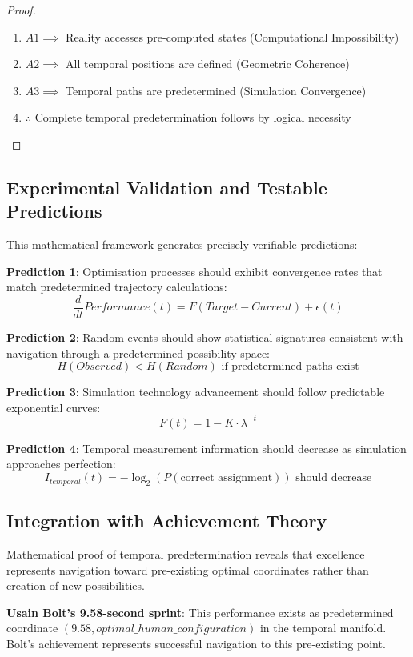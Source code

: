 \documentclass[11pt]{article}
\theoremstyle{remark}
\begin{document}
\begin{proof}
\begin{enumerate}
\item $A1 \implies$ Reality accesses pre-computed states (Computational Impossibility)
\item $A2 \implies$ All temporal positions are defined (Geometric Coherence)
\item $A3 \implies$ Temporal paths are predetermined (Simulation Convergence)
\item $\therefore$ Complete temporal predetermination follows by logical necessity
\end{enumerate}
\end{proof}

\subsection{Experimental Validation and Testable Predictions}

This mathematical framework generates precisely verifiable predictions:

\textbf{Prediction 1}: Optimisation processes should exhibit convergence rates that match predetermined trajectory calculations:
$$\frac{d}{dt}Performance(t) = F(Target - Current) + \epsilon(t)$$

\textbf{Prediction 2}: Random events should show statistical signatures consistent with navigation through a predetermined possibility space:
$$H(Observed) < H(Random) \text{ if predetermined paths exist}$$

\textbf{Prediction 3}: Simulation technology advancement should follow predictable exponential curves:
$$F(t) = 1 - K \cdot \lambda^{-t}$$

\textbf{Prediction 4}: Temporal measurement information should decrease as simulation approaches perfection:
$$I_{temporal}(t) = -\log_2(P(\text{correct assignment})) \text{ should decrease}$$

\subsection{Integration with Achievement Theory}

Mathematical proof of temporal predetermination reveals that excellence represents navigation toward pre-existing optimal coordinates rather than creation of new possibilities.

\textbf{Usain Bolt's 9.58-second sprint}: This performance exists as predetermined coordinate $(9.58, optimal\_human\_configuration)$ in the temporal manifold. Bolt's achievement represents successful navigation to this pre-existing point.
\end{document}
